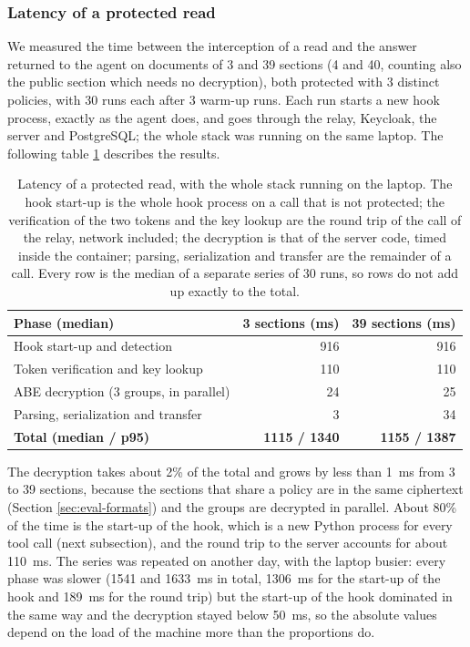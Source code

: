 \subsubsection{Latency of a protected read}
We measured the time between the interception of a read and the answer returned to the agent on documents of 3 and 39 sections (4 and 40, counting also the public section which needs no decryption), both protected with 3 distinct policies, with 30 runs each after 3 warm-up runs.
Each run starts a new hook process, exactly as the agent does, and goes through the relay, Keycloak, the server and PostgreSQL; the whole stack was running on the same laptop.
The following table \ref{tab:eval-latency} describes the results.

\begin{table}[H]
  \centering\small
  \begin{tabular}{@{}lrr@{}}
    \toprule
    \textbf{Phase (median)} & \textbf{3 sections (ms)} & \textbf{39 sections (ms)} \\
    \midrule
    Hook start-up and detection & 916 & 916 \\
    Token verification and key lookup & 110 & 110 \\
    ABE decryption (3 groups, in parallel) & 24 & 25 \\
    Parsing, serialization and transfer & 3 & 34 \\
    \midrule
    \textbf{Total (median / p95)} & \textbf{1115 / 1340} & \textbf{1155 / 1387} \\
    \bottomrule
  \end{tabular}
  \caption{Latency of a protected read, with the whole stack running on the laptop. The hook start-up is the whole hook process on a call that is not protected; the verification of the two tokens and the key lookup are the round trip of the  call of the relay, network included; the decryption is that of the server code, timed inside the container; parsing, serialization and transfer are the remainder of a  call. Every row is the median of a separate series of 30 runs, so rows do not add up exactly to the total.}\label{tab:eval-latency}
\end{table}
The decryption takes about 2\% of the total and grows by less than 1~ms from 3 to 39 sections, because the sections that share a policy are in the same ciphertext (Section \ref{sec:eval-formats}) and the groups are decrypted in parallel.
About 80\% of the time is the start-up of the hook, which is a new Python process for every tool call (next subsection), and the round trip to the server accounts for about 110~ms.
The series was repeated on another day, with the laptop busier: every phase was slower (1541 and 1633~ms in total, 1306~ms for the start-up of the hook and 189~ms for the round trip) but the start-up of the hook dominated in the same way and the decryption stayed below 50~ms, so the absolute values depend on the load of the machine more than the proportions do.
